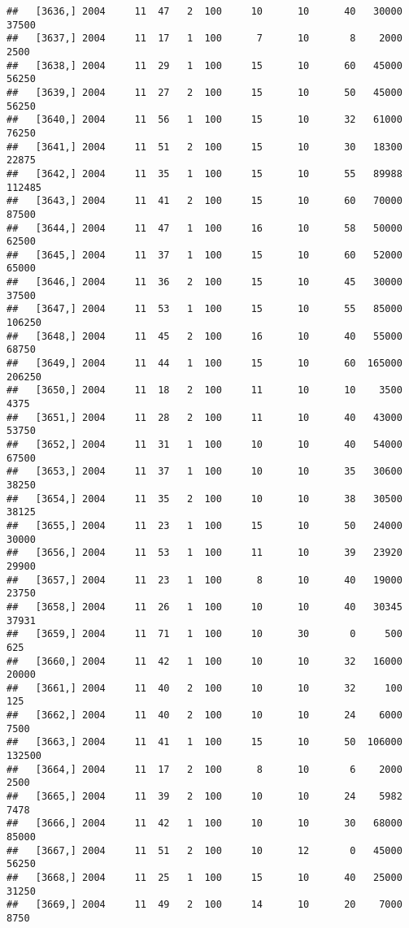 \documentclass{article}\usepackage[]{graphicx}\usepackage[]{color}
\makeatletter
\newenvironment{kframe}{%
 \def\at@end@of@kframe{}%
 \ifinner\ifhmode%
  \def\at@end@of@kframe{\end{minipage}}%
  \begin{minipage}{\columnwidth}%
 \fi\fi%
 \def\FrameCommand##1{\hskip\@totalleftmargin \hskip-\fboxsep
 \colorbox{shadecolor}{##1}\hskip-\fboxsep
     \hskip-\linewidth \hskip-\@totalleftmargin \hskip\columnwidth}%
 \MakeFramed {\advance\hsize-\width
   \@totalleftmargin\z@ \linewidth\hsize
   \@setminipage}}%
 {\par\unskip\endMakeFramed%
 \at@end@of@kframe}
\newenvironment{knitrout}{}{} %
\makeatother
\begin{document}
\begin{knitrout}
\begin{kframe}
\begin{verbatim}
##   [3636,] 2004     11  47   2  100     10      10      40   30000   37500
##   [3637,] 2004     11  17   1  100      7      10       8    2000    2500
##   [3638,] 2004     11  29   1  100     15      10      60   45000   56250
##   [3639,] 2004     11  27   2  100     15      10      50   45000   56250
##   [3640,] 2004     11  56   1  100     15      10      32   61000   76250
##   [3641,] 2004     11  51   2  100     15      10      30   18300   22875
##   [3642,] 2004     11  35   1  100     15      10      55   89988  112485
##   [3643,] 2004     11  41   2  100     15      10      60   70000   87500
##   [3644,] 2004     11  47   1  100     16      10      58   50000   62500
##   [3645,] 2004     11  37   1  100     15      10      60   52000   65000
##   [3646,] 2004     11  36   2  100     15      10      45   30000   37500
##   [3647,] 2004     11  53   1  100     15      10      55   85000  106250
##   [3648,] 2004     11  45   2  100     16      10      40   55000   68750
##   [3649,] 2004     11  44   1  100     15      10      60  165000  206250
##   [3650,] 2004     11  18   2  100     11      10      10    3500    4375
##   [3651,] 2004     11  28   2  100     11      10      40   43000   53750
##   [3652,] 2004     11  31   1  100     10      10      40   54000   67500
##   [3653,] 2004     11  37   1  100     10      10      35   30600   38250
##   [3654,] 2004     11  35   2  100     10      10      38   30500   38125
##   [3655,] 2004     11  23   1  100     15      10      50   24000   30000
##   [3656,] 2004     11  53   1  100     11      10      39   23920   29900
##   [3657,] 2004     11  23   1  100      8      10      40   19000   23750
##   [3658,] 2004     11  26   1  100     10      10      40   30345   37931
##   [3659,] 2004     11  71   1  100     10      30       0     500     625
##   [3660,] 2004     11  42   1  100     10      10      32   16000   20000
##   [3661,] 2004     11  40   2  100     10      10      32     100     125
##   [3662,] 2004     11  40   2  100     10      10      24    6000    7500
##   [3663,] 2004     11  41   1  100     15      10      50  106000  132500
##   [3664,] 2004     11  17   2  100      8      10       6    2000    2500
##   [3665,] 2004     11  39   2  100     10      10      24    5982    7478
##   [3666,] 2004     11  42   1  100     10      10      30   68000   85000
##   [3667,] 2004     11  51   2  100     10      12       0   45000   56250
##   [3668,] 2004     11  25   1  100     15      10      40   25000   31250
##   [3669,] 2004     11  49   2  100     14      10      20    7000    8750

\end{verbatim}
\end{kframe}
\end{knitrout}
\end{document}
